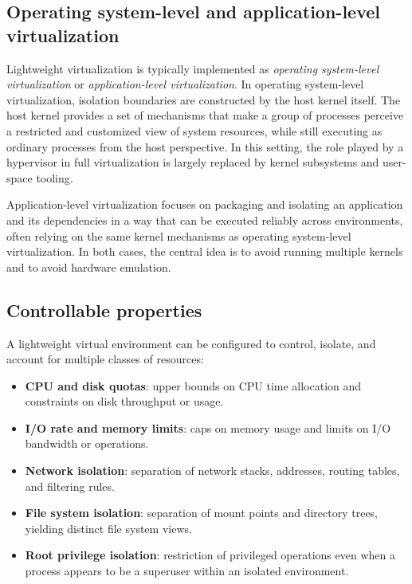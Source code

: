 \documentclass[11pt,a4paper,openany]{report}
\begin{document}
\subsection{Operating system-level and application-level virtualization}

Lightweight virtualization is typically implemented as \emph{operating system-level virtualization} or \emph{application-level virtualization}. In operating system-level virtualization, isolation boundaries are constructed by the host kernel itself. The host kernel provides a set of mechanisms that make a group of processes perceive a restricted and customized view of system resources, while still executing as ordinary processes from the host perspective. In this setting, the role played by a hypervisor in full virtualization is largely replaced by kernel subsystems and user-space tooling.

Application-level virtualization focuses on packaging and isolating an application and its dependencies in a way that can be executed reliably across environments, often relying on the same kernel mechanisms as operating system-level virtualization. In both cases, the central idea is to avoid running multiple kernels and to avoid hardware emulation.

\subsection{Controllable properties}

A lightweight virtual environment can be configured to control, isolate, and account for multiple classes of resources:

\begin{itemize}
\item \textbf{CPU and disk quotas}: upper bounds on CPU time allocation and constraints on disk throughput or usage.
\item \textbf{I/O rate and memory limits}: caps on memory usage and limits on I/O bandwidth or operations.
\item \textbf{Network isolation}: separation of network stacks, addresses, routing tables, and filtering rules.
\item \textbf{File system isolation}: separation of mount points and directory trees, yielding distinct file system views.
\item \textbf{Root privilege isolation}: restriction of privileged operations even when a process appears to be a superuser within an isolated environment.
\end{itemize}
\end{document}
